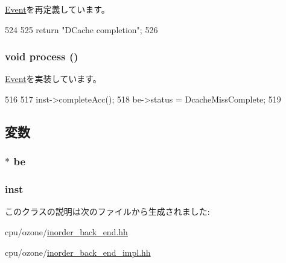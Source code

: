 \hyperlink{classEvent_a130ddddf003422b413e2e891b1b80e8f}{Event}を再定義しています。


\begin{DoxyCode}
524 {
525     return "DCache completion";
526 }
\end{DoxyCode}
\hypertarget{classInorderBackEnd_1_1DCacheCompletionEvent_a2e9c5136d19b1a95fc427e0852deab5c}{
\subsubsection[{process}]{\setlength{\rightskip}{0pt plus 5cm}void process ()}}
\label{classInorderBackEnd_1_1DCacheCompletionEvent_a2e9c5136d19b1a95fc427e0852deab5c}


\hyperlink{classEvent_a142b75b68a6291400e20fb0dd905b1c8}{Event}を実装しています。


\begin{DoxyCode}
516 {
517     inst->completeAcc();
518     be->status = DcacheMissComplete;
519 }
\end{DoxyCode}


\subsection{変数}
\hypertarget{classInorderBackEnd_1_1DCacheCompletionEvent_a3baa3e0e5f56f4dff4d37bbe214925d7}{
\subsubsection[{be}]{$\ast$ {\bf be}}}
\label{classInorderBackEnd_1_1DCacheCompletionEvent_a3baa3e0e5f56f4dff4d37bbe214925d7}
\hypertarget{classInorderBackEnd_1_1DCacheCompletionEvent_af5d4fb974eeb4507d4c837d365d0cefc}{
\subsubsection[{inst}]{ {\bf inst}}}
\label{classInorderBackEnd_1_1DCacheCompletionEvent_af5d4fb974eeb4507d4c837d365d0cefc}


このクラスの説明は次のファイルから生成されました:\begin{DoxyCompactItemize}
\item 
cpu/ozone/\hyperlink{inorder__back__end_8hh}{inorder\_\-back\_\-end.hh}\item 
cpu/ozone/\hyperlink{inorder__back__end__impl_8hh}{inorder\_\-back\_\-end\_\-impl.hh}\end{DoxyCompactItemize}
